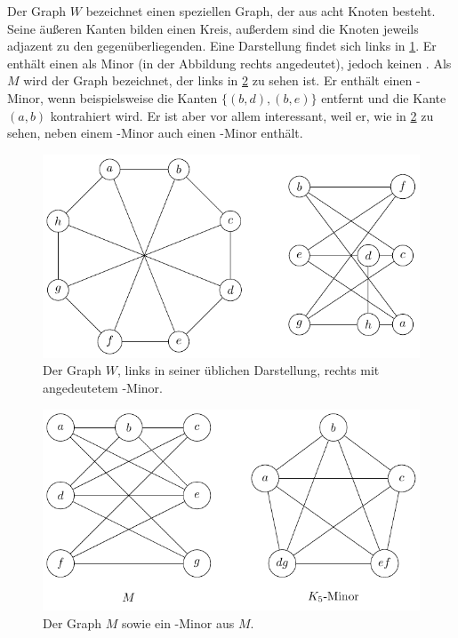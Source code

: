 Der Graph $W$ bezeichnet einen speziellen Graph, der aus acht Knoten besteht.
Seine äußeren Kanten bilden einen Kreis, außerdem sind die Knoten jeweils adjazent zu den gegenüberliegenden. Eine Darstellung findet sich links in \Abb \ref{fig:W}.
Er enthält einen \kdd als Minor (in der Abbildung rechts angedeutet), jedoch keinen \kf.
Als $M$ wird der Graph bezeichnet, der links in \Abb \ref{fig:M} zu sehen ist.
Er enthält einen \kdd-Minor, wenn beispielsweise die Kanten $\{(b, d), (b, e)\}$ entfernt und die Kante $(a, b)$ kontrahiert wird.
Er ist aber vor allem interessant, weil er, wie in \Abb \ref{fig:M} zu sehen, neben einem \kdd-Minor auch einen \kf-Minor enthält.
\begin{figure}[H]
  \centering
  \includegraphics[keepaspectratio]{bilder/W.pdf}
  \caption{Der Graph $W$, links in seiner üblichen Darstellung, rechts mit angedeutetem \kdd-Minor.}
  \label{fig:W}
\end{figure}

\begin{figure}[H]
  \centering
  \includegraphics[keepaspectratio]{bilder/M.pdf}
  \caption{Der Graph $M$ sowie ein \kf-Minor aus $M$.}
  \label{fig:M}
\end{figure}

